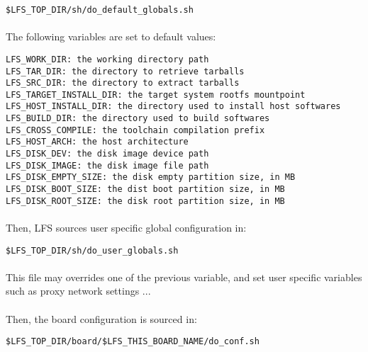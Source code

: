 \documentclass[a4paper, 11pt]{article}
\begin{document}
\begin{lstlisting}[frame=tb]
$LFS_TOP_DIR/sh/do_default_globals.sh
\end{lstlisting}

\paragraph{}
The following variables are set to default values:\\
\begin{lstlisting}[frame=tb]
LFS_WORK_DIR: the working directory path
LFS_TAR_DIR: the directory to retrieve tarballs
LFS_SRC_DIR: the directory to extract tarballs
LFS_TARGET_INSTALL_DIR: the target system rootfs mountpoint
LFS_HOST_INSTALL_DIR: the directory used to install host softwares
LFS_BUILD_DIR: the directory used to build softwares
LFS_CROSS_COMPILE: the toolchain compilation prefix
LFS_HOST_ARCH: the host architecture
LFS_DISK_DEV: the disk image device path
LFS_DISK_IMAGE: the disk image file path
LFS_DISK_EMPTY_SIZE: the disk empty partition size, in MB
LFS_DISK_BOOT_SIZE: the dist boot partition size, in MB
LFS_DISK_ROOT_SIZE: the disk root partition size, in MB
\end{lstlisting}

\paragraph{}
Then, LFS sources user specific global configuration in:\\

\begin{lstlisting}[frame=tb]
$LFS_TOP_DIR/sh/do_user_globals.sh
\end{lstlisting}

\paragraph{}
This file may overrides one of the previous variable, and set user specific
variables such as proxy network settings ...

\paragraph{}
Then, the board configuration is sourced in:\\

\begin{lstlisting}[frame=tb]
$LFS_TOP_DIR/board/$LFS_THIS_BOARD_NAME/do_conf.sh
\end{lstlisting}
\end{document}
